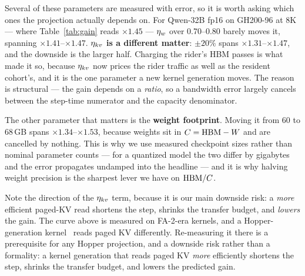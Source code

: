 Several of these parameters are measured with error, so it is worth asking
which ones the projection actually depends on. For Qwen-32B fp16 on GH200-96 at
8K --- where Table~\ref{tab:gain} reads $\times1.45$ --- $\eta_w$ over 0.70--0.80
barely moves it, spanning $\times1.41$--$\times1.47$. \textbf{$\eta_{kv}$ is a
different matter}: $\pm20\%$ spans $\times1.31$--$\times1.47$, and the downside
is the larger half. Charging the
rider's HBM passes is what made it so, because $\eta_{kv}$ now prices the rider
traffic as well as the resident cohort's, and it is the one parameter a new
kernel generation moves. The reason is structural --- the gain depends on a
\emph{ratio}, so a bandwidth error largely cancels between the step-time
numerator and the capacity denominator.

The other parameter that matters is the \textbf{weight footprint}. Moving it
from 60 to 68\,GB spans $\times1.34$--$\times1.53$, because weights sit in
$C = \mathrm{HBM} - W$ and are cancelled by nothing. This is why we use measured
checkpoint sizes rather than nominal parameter counts --- for a quantized model
the two differ by gigabytes and the error propagates undamped into the headline
--- and it is why halving weight precision is the sharpest lever we have on
$\mathrm{HBM}/C$.

Note the direction of the $\eta_{kv}$ term, because it is our main downside risk:
a \emph{more} efficient paged-KV read shortens the step, shrinks the transfer
budget, and \emph{lowers} the gain. The curve above is measured on FA-2-era
kernels, and a Hopper-generation kernel~\cite{flashattention3} reads paged KV
differently. Re-measuring it there is a prerequisite for any Hopper
projection, and a downside risk rather than a formality: a kernel generation
that reads paged KV \emph{more} efficiently shortens the step, shrinks the
transfer budget, and lowers the predicted gain.
